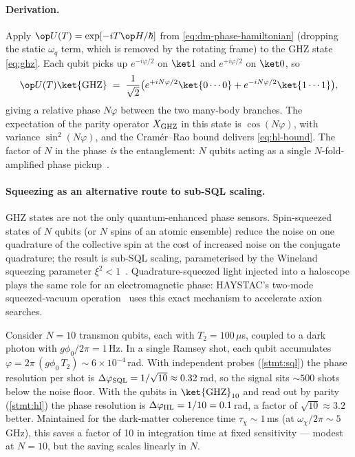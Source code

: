 \paragraph{Derivation.}
Apply $\op U(T)=\exp[-i T \op H/\hbar]$ from
\cref{eq:dm-phase-hamiltonian} (dropping the static
$\omega_q$ term, which is removed by the rotating frame) to
the GHZ state \cref{eq:ghz}. Each qubit picks up
$e^{-i\varphi/2}$ on $\ket 1$ and $e^{+i\varphi/2}$ on
$\ket 0$, so
\begin{equation}
\op U(T)\ket{\rm GHZ} \;=\; \frac{1}{\sqrt 2}
\bigl(e^{+iN\varphi/2}\ket{0\cdots 0}
+ e^{-iN\varphi/2}\ket{1\cdots 1}\bigr),
\end{equation}
giving a relative phase $N\varphi$ between the two
many-body branches. The expectation of the parity operator
$X_{\rm GHZ}$ in this state is $\cos(N\varphi)$, with
variance $\sin^2(N\varphi)$, and the Cram\'{e}r--Rao bound
delivers \cref{eq:hl-bound}. The factor of $N$ in the phase
\emph{is} the entanglement: $N$ qubits acting as a single
$N$-fold-amplified phase pickup~\cite{giovannetti2011,pezze2018}.

\paragraph{Squeezing as an alternative route to sub-SQL scaling.}
GHZ states are not the only quantum-enhanced phase sensors.
Spin-squeezed states of $N$ qubits (or $N$ spins of an atomic
ensemble) reduce the noise on one quadrature of the collective
spin at the cost of increased noise on the conjugate
quadrature; the result is sub-SQL scaling, parameterised by
the Wineland squeezing parameter $\xi^2<1$~\cite{wineland1992}.
Quadrature-squeezed light injected into a haloscope plays the
same role for an electromagnetic phase: HAYSTAC's two-mode
squeezed-vacuum operation~\cite{malnou2019,haystac2021} uses
this exact mechanism to accelerate axion searches.

\begin{example}
\label{ex:hl-darkphoton}
Consider $N=10$ transmon qubits, each with $T_2=100\,\mu$s,
coupled to a dark photon with $g\phi_0/2\pi=1$\,Hz. In a single
Ramsey shot, each qubit accumulates $\varphi=2\pi\,(g\phi_0\,T_2)
\sim 6\times 10^{-4}$\,rad. With independent probes
(\cref{stmt:sql}) the phase resolution per shot is
$\Delta\varphi_{\rm SQL}=1/\sqrt{10}\approx 0.32$\,rad, so the
signal sits $\sim 500$ shots below the noise floor. With the
qubits in $\ket{\rm GHZ}_{10}$ and read out by parity
(\cref{stmt:hl}) the phase resolution is
$\Delta\varphi_{\rm HL}=1/10=0.1$\,rad, a factor of
$\sqrt{10}\approx 3.2$ better. Maintained for the dark-matter
coherence time $\tau_\chi\sim 1$\,ms (at $\omega_\chi/2\pi
\sim 5$\,GHz), this saves a factor of 10 in integration time at
fixed sensitivity --- modest at $N=10$, but the saving scales
linearly in $N$.
\end{example}

